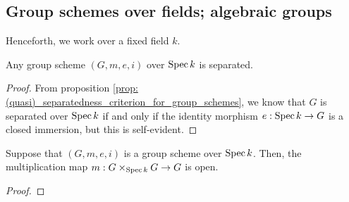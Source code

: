     \subsection{Group schemes over fields; algebraic groups}
        \begin{convention}
            Henceforth, we work over a fixed field $k$.
        \end{convention}
        
        \begin{proposition} \label{prop: group_schemes_over_fields_are_separated}
            Any group scheme $(G, m, e, i)$ over $\operatorname{Spec} k$ is separated. 
        \end{proposition}
            \begin{proof}
                From proposition \ref{prop: (quasi)_separatedness_criterion_for_group_schemes}, we know that $G$ is separated over $\operatorname{Spec} k$ if and only if the identity morphism $e: \operatorname{Spec} k \to G$ is a closed immersion, but this is self-evident.
            \end{proof}
        
        \begin{proposition} \label{prop: multiplication_maps_of_group_schemes_over_fields_are_open}
            Suppose that $(G, m, e, i)$ is a group scheme over $\operatorname{Spec} k$. Then, the multiplication map $m: G \x_{\Spec k} G \to G$ is open.
        \end{proposition}
            \begin{proof}
                
            \end{proof}
        
